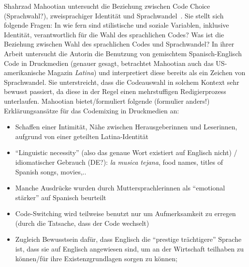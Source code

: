 Shahrzad Mahootian untersucht die Beziehung zwischen Code Choice (Sprachwahl?), zweisprachiger Identität und Sprachwandel~\cite[]{Mahootian05}.
Sie stellt sich folgende Fragen: In wie fern sind stilistische und soziale Variablen, inklusive Identität, verantwortlich für die Wahl des sprachlichen Codes?
Was ist die Beziehung zwischen Wahl des sprachlichen Codes und Sprachwandel?
In ihrer Arbeit untersucht die Autorin die Benutzung von gemischtem Spanisch-Englisch Code in Druckmedien (genauer gesagt, betrachtet Mahootian auch das US-amerikanische Magazin \textit{Latina}) und interpretiert diese bereits als ein Zeichen von Sprachwandel.
Sie unterstreicht, dass die Codeauswahl in solchem Kontext sehr bewusst passiert, da diese in der Regel einen mehrstuffigen Redigierprozess unterlaufen.
Mahootian bietet/formuliert folgende (formulier anders!) Erklärungsansätze für das Codemixing in Druckmedien an:
\begin{itemize}
  \item Schaffen einer Intimität, Nähe zwischen Herausgeberinnen und Leserinnen, aufgrund von einer geteilten Latina-Identität
  \item ``Linguistic necessity'' (also das genaue Wort existiert auf Englisch nicht) / idiomatischer Gebrauch (DE?): \textit{la musica tejana}, food names, titles of Spanish songs, movies,..
  \item Manche Ausdrücke wurden durch Muttersprachlerinnen als ``emotional stärker'' auf Spanisch beurteilt
  \item Code-Switching wird teilweise benutzt nur um Aufmerksamkeit zu erregen (durch die Tatsache, dass der Code wechselt)
  \item Zugleich Bewusstsein dafür, dass Englisch die ``prestige trächtigere'' Sprache ist, dass sie auf Englisch angewiesen sind, um an der Wirtschaft teilhaben zu können/für ihre Existenzgrundlagen sorgen zu können;
\end{itemize}

